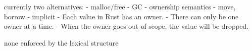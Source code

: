 \documentclass[12pt]{article}
\begin{document}
currently two alternatives:
    - malloc/free
    - GC
    - ownership semantics
        - move, borrow
            - implicit
        - Each value in Rust has an owner.
        - There can only be one owner at a time.
        - When the owner goes out of scope, the value will be dropped.

none enforced by the lexical structure



\label{sec.introduction}



\end{document}
